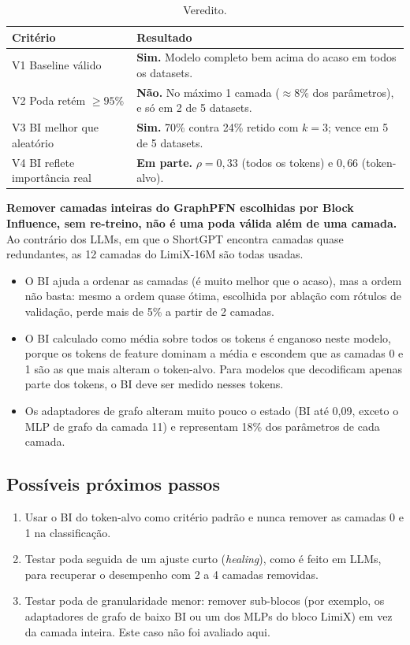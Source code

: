 \documentclass[11pt,a4paper]{article}
\begin{document}
\begin{table}[H]
\centering
\caption{Veredito.}
\label{tab:veredito}
\begin{tabular}{@{}lp{9.5cm}@{}}
\toprule
Critério & Resultado \\
\midrule
V1 Baseline válido & \textbf{Sim.} Modelo completo bem acima do acaso em todos os datasets. \\
V2 Poda retém $\geq 95\%$ & \textbf{Não.} No máximo 1 camada ($\approx 8\%$ dos parâmetros), e só em 2 de 5 datasets. \\
V3 BI melhor que aleatório & \textbf{Sim.} 70\% contra 24\% retido com $k=3$; vence em 5 de 5 datasets. \\
V4 BI reflete importância real & \textbf{Em parte.} $\rho = 0{,}33$ (todos os tokens) e $0{,}66$ (token-alvo). \\
\bottomrule
\end{tabular}
\end{table}

\textbf{Remover camadas inteiras do GraphPFN escolhidas por Block Influence, sem re-treino, não é uma poda válida além de uma camada.} Ao contrário dos LLMs, em que o ShortGPT encontra camadas quase redundantes, as 12 camadas do LimiX-16M são todas usadas.

\begin{itemize}
  \item O BI ajuda a ordenar as camadas (é muito melhor que o acaso), mas a ordem não basta: mesmo a ordem quase ótima, escolhida por ablação com rótulos de validação, perde mais de 5\% a partir de 2 camadas.
  \item O BI calculado como média sobre todos os tokens é enganoso neste modelo, porque os tokens de feature dominam a média e escondem que as camadas 0 e 1 são as que mais alteram o token-alvo. Para modelos que decodificam apenas parte dos tokens, o BI deve ser medido nesses tokens.
  \item Os adaptadores de grafo alteram muito pouco o estado (BI até 0,09, exceto o MLP de grafo da camada 11) e representam 18\% dos parâmetros de cada camada.
\end{itemize}

\subsection*{Possíveis próximos passos}

\begin{enumerate}
  \item Usar o BI do token-alvo como critério padrão e nunca remover as camadas 0 e 1 na classificação.
  \item Testar poda seguida de um ajuste curto (\emph{healing}), como é feito em LLMs, para recuperar o desempenho com 2 a 4 camadas removidas.
  \item Testar poda de granularidade menor: remover sub-blocos (por exemplo, os adaptadores de grafo de baixo BI ou um dos MLPs do bloco LimiX) em vez da camada inteira. Este caso não foi avaliado aqui.
\end{enumerate}
\end{document}
